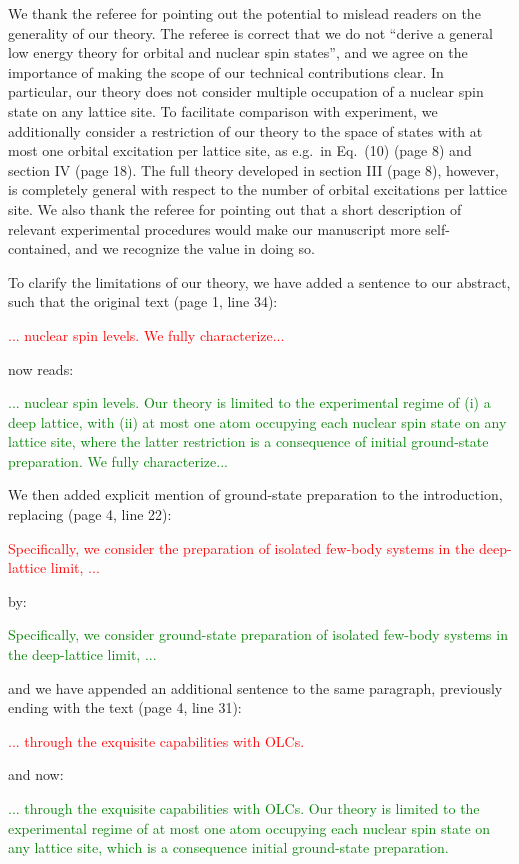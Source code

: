 \documentclass[preprint]{revtex4-1}
\newcommand{\1}{\mathds{1}}
\newcommand{\red}[1]{\textcolor{red}{#1}}
\newcommand{\green}[1]{\textcolor{green}{#1}}
\begin{document}
\begin{enumerate}
  We thank the referee for pointing out the potential to mislead
  readers on the generality of our theory.  The referee is correct
  that we do not ``derive a general low energy theory for orbital and
  nuclear spin states'', and we agree on the importance of making the
  scope of our technical contributions clear.  In particular, our
  theory does not consider multiple occupation of a nuclear spin state
  on any lattice site.  To facilitate comparison with experiment, we
  additionally consider a restriction of our theory to the space of
  states with at most one orbital excitation per lattice site, as
  e.g.~in Eq.~(10) (page 8) and section IV (page 18).  The full theory
  developed in section III (page 8), however, is completely general
  with respect to the number of orbital excitations per lattice site.
  We also thank the referee for pointing out that a short description
  of relevant experimental procedures would make our manuscript more
  self-contained, and we recognize the value in doing so.

  To clarify the limitations of our theory, we have added a sentence
  to our abstract, such that the original text (page 1, line 34):

  \red{... nuclear spin levels.  We fully characterize...}

  now reads:

  \green{... nuclear spin levels.  Our theory is limited to the
    experimental regime of (i) a deep lattice, with (ii) at most one
    atom occupying each nuclear spin state on any lattice site, where
    the latter restriction is a consequence of initial ground-state
    preparation.  We fully characterize...}

  We then added explicit mention of ground-state preparation to the
  introduction, replacing (page 4, line 22):

  \red{Specifically, we consider the preparation of isolated few-body
    systems in the deep-lattice limit, ...}

  by:

  \green{Specifically, we consider ground-state preparation of
    isolated few-body systems in the deep-lattice limit, ...}

  and we have appended an additional sentence to the same paragraph,
  previously ending with the text (page 4, line 31):

  \red{... through the exquisite capabilities with OLCs.}

  and now:

  \green{... through the exquisite capabilities with OLCs.  Our theory
    is limited to the experimental regime of at most one atom
    occupying each nuclear spin state on any lattice site, which is a
    consequence initial ground-state preparation.}


\end{enumerate}
\end{document}
